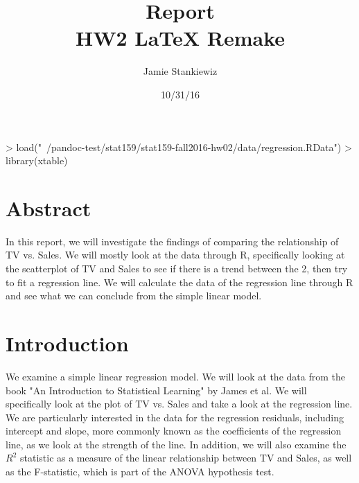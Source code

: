 \documentclass{article}
\begin{document}
\title{Report \\
HW2 LaTeX Remake}
\author{Jamie Stankiewiz}
\date{10/31/16}
\maketitle




\begin{Schunk}
\begin{Sinput}
> load("~/pandoc-test/stat159/stat159-fall2016-hw02/data/regression.RData")
> library(xtable)
\end{Sinput}
\end{Schunk}


\section{Abstract}

  In this report, we will investigate the findings of comparing the relationship of TV vs. Sales.  We will mostly look at the data through R, specifically looking at the scatterplot of TV and Sales to see if there is a trend between the 2, then try to fit a regression line. We will calculate the data of the regression line through R and see what we can conclude from the simple linear model.


\section{Introduction}

  We examine a simple linear regression model.  We will look at the data from the book "An Introduction to Statistical Learning" by James et al.  We will specifically look at the plot of TV vs. Sales and take a look at the regression line.  We are particularly interested in the data for the regression residuals, including intercept and slope, more commonly known as the coefficients of the regression line, as we look at the strength of the line.  In addition, we will also examine the $R^2$ statistic as a measure of the linear relationship between TV and Sales, as well as the F-statistic, which is part of the ANOVA hypothesis test.
\end{document}
